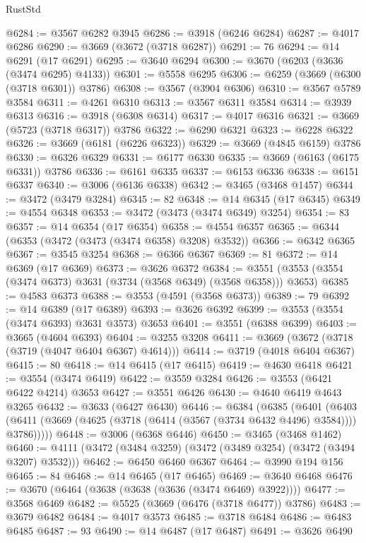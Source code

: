 \begin{lexlean}{RustStd}
\begin{coremodule}
@6284 := @3567 @6282 @3945
@6286 := @3918 (@6246 @6284)
@6287 := @4017 @6286
@6290 := @3669 (@3672 (@3718 @6287))
@6291 := 76
@6294 := @14 @6291 (@17 @6291)
@6295 := @3640 @6294
@6300 := @3670 (@6203 (@3636 (@3474 @6295) @4133))
@6301 := @5558 @6295
@6306 := @6259 (@3669 (@6300 (@3718 @6301)) @3786)
@6308 := @3567 (@3904 @6306)
@6310 := @3567 @5789 @3584
@6311 := @4261 @6310
@6313 := @3567 @6311 @3584
@6314 := @3939 @6313
@6316 := @3918 (@6308 @6314)
@6317 := @4017 @6316
@6321 := @3669 (@5723 (@3718 @6317)) @3786
@6322 := @6290 @6321
@6323 := @6228 @6322
@6326 := @3669 (@6181 (@6226 @6323))
@6329 := @3669 (@4845 @6159) @3786
@6330 := @6326 @6329
@6331 := @6177 @6330
@6335 := @3669 (@6163 (@6175 @6331)) @3786
@6336 := @6161 @6335
@6337 := @6153 @6336
@6338 := @6151 @6337
@6340 := @3006 (@6136 @6338)
@6342 := @3465 (@3468 @1457)
@6344 := @3472 (@3479 @3284)
@6345 := 82
@6348 := @14 @6345 (@17 @6345)
@6349 := @4554 @6348
@6353 := @3472 (@3473 (@3474 @6349) @3254)
@6354 := 83
@6357 := @14 @6354 (@17 @6354)
@6358 := @4554 @6357
@6365 := @6344 (@6353 (@3472 (@3473 (@3474 @6358) @3208) @3532))
@6366 := @6342 @6365
@6367 := @3545 @3254
@6368 := @6366 @6367
@6369 := 81
@6372 := @14 @6369 (@17 @6369)
@6373 := @3626 @6372
@6384 := @3551 (@3553 (@3554 (@3474 @6373) @3631 (@3734 (@3568 @6349) (@3568 @6358))) @3653)
@6385 := @4583 @6373
@6388 := @3553 (@4591 (@3568 @6373))
@6389 := 79
@6392 := @14 @6389 (@17 @6389)
@6393 := @3626 @6392
@6399 := @3553 (@3554 (@3474 @6393) @3631 @3573) @3653
@6401 := @3551 (@6388 @6399)
@6403 := @3665 (@4604 @6393)
@6404 := @3255 @3208
@6411 := @3669 (@3672 (@3718 (@3719 (@4047 @6404 @6367) @4614)))
@6414 := @3719 (@4018 @6404 @6367)
@6415 := 80
@6418 := @14 @6415 (@17 @6415)
@6419 := @4630 @6418
@6421 := @3554 (@3474 @6419)
@6422 := @3559 @3284
@6426 := @3553 (@6421 @6422 @4214) @3653
@6427 := @3551 @6426
@6430 := @4640 @6419 @4643 @3265
@6432 := @3633 (@6427 @6430)
@6446 := @6384
    (@6385
      (@6401
        (@6403 (@6411 (@3669 (@4625 (@3718 (@6414 (@3567 (@3734 @6432 @4496) @3584)))) @3786)))))
@6448 := @3006 (@6368 @6446)
@6450 := @3465 (@3468 @1462)
@6460 := @4111 (@3472 (@3484 @3259) (@3472 (@3489 @3254) (@3472 (@3494 @3207) @3532)))
@6462 := @6450 @6460 @6367
@6464 := @3990 @194 @156
@6465 := 84
@6468 := @14 @6465 (@17 @6465)
@6469 := @3640 @6468
@6476 := @3670 (@6464 (@3638 (@3638 (@3636 (@3474 @6469) @3922))))
@6477 := @3568 @6469
@6482 := @5525 (@3669 (@6476 (@3718 @6477)) @3786)
@6483 := @3679 @6482
@6484 := @4017 @3573
@6485 := @3718 @6484
@6486 := @6483 @6485
@6487 := 93
@6490 := @14 @6487 (@17 @6487)
@6491 := @3626 @6490

\end{coremodule}
\end{lexlean}
